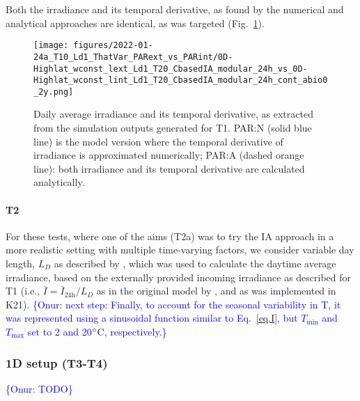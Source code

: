 \documentclass[gmd, manuscript, draft]{copernicus}
\newcommand{\onur}[1]{\textcolor{blue}{\{Onur: #1\}}}
\begin{document}
    Both the irradiance and its temporal derivative, as found by the numerical and analytical approaches are identical, as was targeted (Fig.~\ref{f.T1light}).
    \begin{figure}[ht!]
    \texttt{[image: figures/2022-01-24a\_T10\_Ld1\_ThatVar\_PARext\_vs\_PARint/0D-Highlat\_wconst\_lext\_Ld1\_T20\_CbasedIA\_modular\_24h\_vs\_0D-Highlat\_wconst\_lint\_Ld1\_T20\_CbasedIA\_modular\_24h\_cont\_abio0\_2y.png]}
    \caption{Daily average irradiance and its temporal derivative, as extracted from the simulation outputs generated for T1. PAR:N (solid blue line) is the model version where the temporal derivative of irradiance is approximated numerically; PAR:A (dashed orange line): both irradiance and its temporal derivative are calculated analytically.\label{f.T1light}}
    \end{figure}

    
    \paragraph{T2}
    For these tests, where one of the aims (T2a) was to try the IA approach in a more realistic setting with multiple time-varying factors, we consider variable day length, $L_D$ as described by \citet{Forsythe2003}, which was used to calculate the daytime average irradiance, based on the externally provided incoming irradiance as described for T1 (i.e., $\bar{I}=\bar{I}_{\text{24h}}/L_D$ as in the original model by \citep{Pahlowetal13}, and as was implemented in K21). \onur{next step: Finally, to account for the seasonal variability in T, it was represented using a sinusoidal function similar to Eq.~\ref{eq.I}, but $T_{\min}$ and $T_{\max}$ set to 2 and 20$^{\circ}$C, respectively.}
    
\subsubsection{1D setup (T3-T4)}
    \onur{TODO}


\end{document}
